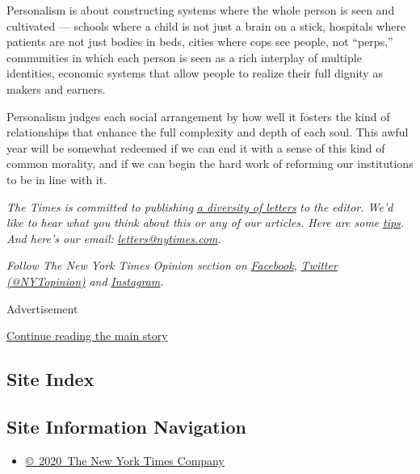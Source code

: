 Personalism is about constructing systems where the whole person is seen
and cultivated --- schools where a child is not just a brain on a stick,
hospitals where patients are not just bodies in beds, cities where cops
see people, not ``perps,'' communities in which each person is seen as a
rich interplay of multiple identities, economic systems that allow
people to realize their full dignity as makers and earners.

Personalism judges each social arrangement by how well it fosters the
kind of relationships that enhance the full complexity and depth of each
soul. This awful year will be somewhat redeemed if we can end it with a
sense of this kind of common morality, and if we can begin the hard work
of reforming our institutions to be in line with it.

\emph{The Times is committed to publishing}
\href{https://www.nytimes.com/2019/01/31/opinion/letters/letters-to-editor-new-york-times-women.html}{\emph{a
diversity of letters}} \emph{to the editor. We'd like to hear what you
think about this or any of our articles. Here are some}
\href{https://help.nytimes.com/hc/en-us/articles/115014925288-How-to-submit-a-letter-to-the-editor}{\emph{tips}}\emph{.
And here's our email:}
\href{mailto:letters@nytimes.com}{\emph{letters@nytimes.com}}\emph{.}

\emph{Follow The New York Times Opinion section on}
\href{https://www.facebook.com/nytopinion}{\emph{Facebook}}\emph{,}
\href{http://twitter.com/NYTOpinion}{\emph{Twitter (@NYTopinion)}}
\emph{and}
\href{https://www.instagram.com/nytopinion/}{\emph{Instagram}}\emph{.}

Advertisement

\protect\hyperlink{after-bottom}{Continue reading the main story}

\hypertarget{site-index}{%
\subsection{Site Index}\label{site-index}}

\hypertarget{site-information-navigation}{%
\subsection{Site Information
Navigation}\label{site-information-navigation}}

\begin{itemize}
\tightlist
\item
  \href{https://help.nytimes.com/hc/en-us/articles/115014792127-Copyright-notice}{©~2020~The
  New York Times Company}
\end{itemize}

